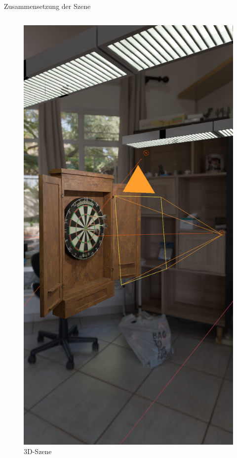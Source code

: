 \begin{frame}{Zusammensetzung der Szene}
\begin{columns}
\begin{column}{0.4\linewidth}
            \begin{figure}
                \centering
                \includegraphics[height=0.75\textheight]{imgs/blender.png}
                \caption{3D-Szene}
            \end{figure}

        \end{column}
    \end{columns}

\end{frame}

